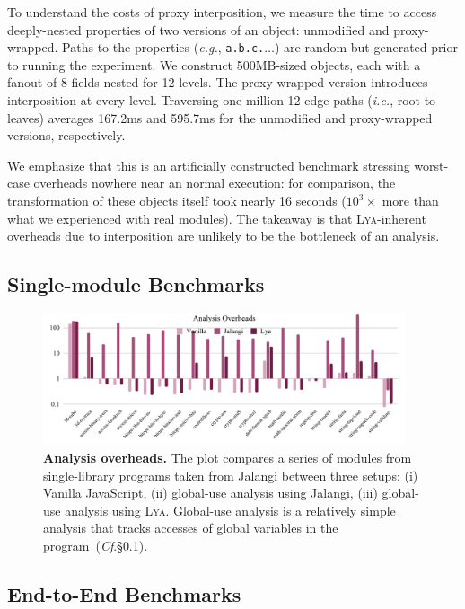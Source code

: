 \documentclass[letterpaper,twocolumn,10pt]{article}
\def\eg{{\em e.g.}, }
\def\ie{{\em i.e.}, }
\newcommand{\ttt}[1]{\texttt{#1}}
\newcommand{\cf}[1]{(\emph{Cf}.\S\ref{#1})}
\newcommand{\sys}{{\scshape Lya}\xspace}
\begin{document}
To understand the costs of proxy interposition, we measure the time to access deeply-nested properties of two versions of an object:
  unmodified and proxy-wrapped.
Paths to the properties (\eg \ttt{a.b.c.$\ldots$}) are random but generated prior to running the experiment.
We construct 500MB-sized objects, each with a fanout of 8 fields nested for 12 levels.
The proxy-wrapped version introduces interposition at every level.
Traversing one million 12-edge paths (\ie root to leaves) averages 167.2ms and 595.7ms for the unmodified and proxy-wrapped versions, respectively.

We emphasize that this is an artificially constructed benchmark stressing worst-case overheads nowhere near an normal execution:
  for comparison, the transformation of these objects itself took nearly 16 seconds ($10^3\times$ more than what we experienced with real modules).
The takeaway is that \sys-inherent overheads due to interposition are unlikely to be the bottleneck of an analysis.

\subsection{Single-module Benchmarks}
\label{meso}

\begin{figure}[t]
  \centering
   \includegraphics[width=0.95\textwidth]{./figs/meso.pdf}
  \caption{
    \textbf{Analysis overheads.}
    The plot compares a series of modules from single-library programs taken from Jalangi between three setups:
		(i) Vanilla JavaScript, (ii) global-use analysis using Jalangi, (iii) global-use analysis using \sys.
    Global-use analysis is a relatively simple analysis that tracks accesses of global variables in the program~\cf{meso}.
  }
  \label{fig:meso}
  \vspace{-3mm}
\end{figure}


\subsection{End-to-End Benchmarks}
\label{macro}
\end{document}
